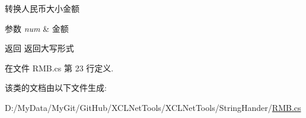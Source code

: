 转换人民币大小金额 


\begin{DoxyParams}{参数}
{\em num} & 金额\\
\hline
\end{DoxyParams}
\begin{DoxyReturn}{返回}
返回大写形式
\end{DoxyReturn}


在文件 R\-M\-B.\-cs 第 23 行定义.



该类的文档由以下文件生成\-:\begin{DoxyCompactItemize}
\item 
D\-:/\-My\-Data/\-My\-Git/\-Git\-Hub/\-X\-C\-L\-Net\-Tools/\-X\-C\-L\-Net\-Tools/\-String\-Hander/\hyperlink{_r_m_b_8cs}{R\-M\-B.\-cs}\end{DoxyCompactItemize}
